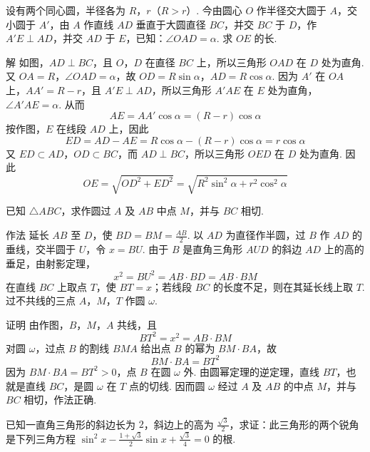 \begin{problem}
设有两个同心圆，半径各为 \(R\)，\(r\)（\(R>r\)）. 今由圆心 \(O\) 作半径交大圆于 \(A\)，交小圆于 \(A'\)，由 \(A\) 作直线 \(AD\) 垂直于大圆直径 \(BC\)，并交 \(BC\) 于 \(D\)，作 \(A'E\perp AD\)，并交 \(AD\) 于 \(E\)，已知：\(\angle OAD=\alpha\). 求 \(OE\) 的长.
\end{problem}

\begin{solution}
解 如图，\(AD\perp BC\)，且 \(O\)，\(D\) 在直径 \(BC\) 上，所以三角形 \(OAD\) 在 \(D\) 处为直角. 又 \(OA=R\)，\(\angle OAD=\alpha\)，故
\(OD=R\sin\alpha\)，\(AD=R\cos\alpha\).
因为 \(A'\) 在 \(OA\) 上，\(AA'=R-r\)，且 \(A'E\perp AD\)，所以三角形 \(A'AE\) 在 \(E\) 处为直角，\(\angle A'AE=\alpha\). 从而
\[
AE=AA'\cos\alpha=\left(R-r\right)\cos\alpha
\]
按作图，\(E\) 在线段 \(AD\) 上，因此
\[
ED=AD-AE=R\cos\alpha-\left(R-r\right)\cos\alpha=r\cos\alpha
\]
又 \(ED\subset AD\)，\(OD\subset BC\)，而 \(AD\perp BC\)，所以三角形 \(OED\) 在 \(D\) 处为直角. 因此
\[
OE=\sqrt{OD^{2}+ED^{2}}=\sqrt{R^{2}\sin^{2}\alpha+r^{2}\cos^{2}\alpha}
\]
\end{solution}

\begin{problem}
已知 \(\triangle ABC\)，求作圆过 \(A\) 及 \(AB\) 中点 \(M\)，并与 \(BC\) 相切.
\end{problem}

\begin{solution}
作法 延长 \(AB\) 至 \(D\)，使 \(BD=BM=\frac{AB}{2}\). 以 \(AD\) 为直径作半圆，过 \(B\) 作 \(AD\) 的垂线，交半圆于 \(U\)，令 \(x=BU\). 由于 \(B\) 是直角三角形 \(AUD\) 的斜边 \(AD\) 上的高的垂足，由射影定理，
\[
x^{2}=BU^{2}=AB\cdot BD=AB\cdot BM
\]
在直线 \(BC\) 上取点 \(T\)，使 \(BT=x\)；若线段 \(BC\) 的长度不足，则在其延长线上取 \(T\). 过不共线的三点 \(A\)，\(M\)，\(T\) 作圆 \(\omega\).

证明 由作图，\(B\)，\(M\)，\(A\) 共线，且
\[
BT^{2}=x^{2}=AB\cdot BM
\]
对圆 \(\omega\)，过点 \(B\) 的割线 \(BMA\) 给出点 \(B\) 的幂为 \(BM\cdot BA\)，故
\[
BM\cdot BA=BT^{2}
\]
因为 \(BM\cdot BA=BT^{2}>0\)，点 \(B\) 在圆 \(\omega\) 外. 由圆幂定理的逆定理，直线 \(BT\)，也就是直线 \(BC\)，是圆 \(\omega\) 在 \(T\) 点的切线. 因而圆 \(\omega\) 经过 \(A\) 及 \(AB\) 的中点 \(M\)，并与 \(BC\) 相切，作法正确.
\end{solution}

\begin{problem}
已知一直角三角形的斜边长为 \(2\)，斜边上的高为 \(\frac{\sqrt{3}}{2}\)，求证：此三角形的两个锐角是下列三角方程 \(\sin^{2}x-\frac{1+\sqrt{3}}{2}\sin x+\frac{\sqrt{3}}{4}=0\) 的根.
\end{problem}

